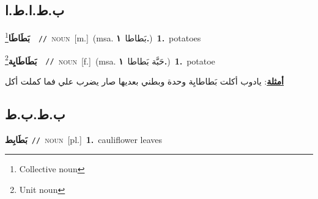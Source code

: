 \documentclass[10pt,a4paper,twoside]{article} %
\begin{document}
\begin{multicols}{2}
\vspace{-3mm}
\subsection*{\color{blue}\foreignlanguage{arabic}{ب.ط.ا.ط.ا}\color{blue}{ (ntws)}} 

{\setlength\topsep{0pt}\textbf{\foreignlanguage{arabic}{بَطَاطَا}}\footnote{Collective noun}\ \ {\color{gray}\texttt{//}\color{black}}\ \textsc{noun}\ [m.]\ \color{gray}(msa. \foreignlanguage{arabic}{بَطاطا}~\foreignlanguage{arabic}{\textbf{١.}})\color{black}\ \textbf{1.}~potatoes\ } \vspace{2mm}

{\setlength\topsep{0pt}\textbf{\foreignlanguage{arabic}{بَطَاطَايِة}}\footnote{Unit noun}\ \ {\color{gray}\texttt{//}\color{black}}\ \textsc{noun}\ [f.]\ \color{gray}(msa. \foreignlanguage{arabic}{حَبَّة بَطاطا}~\foreignlanguage{arabic}{\textbf{١.}})\color{black}\ \textbf{1.}~potatoe\  \begin{flushright}\color{gray}\foreignlanguage{arabic}{\textbf{\underline{\foreignlanguage{arabic}{أمثلة}}}: يادوب أكلت بَطاطايِة وحدة وبطني بعديها صار يضرب علي فما كملت أكل}\end{flushright}\color{black}} \vspace{2mm}

\vspace{-3mm}
\subsection*{\color{blue}\foreignlanguage{arabic}{ب.ط.ب.ط}\color{blue}{}} 

{\setlength\topsep{0pt}\textbf{\foreignlanguage{arabic}{بَطَابِط}}\ {\color{gray}\texttt{//}\color{black}}\ \textsc{noun}\ [pl.]\ \textbf{1.}~cauliflower leaves\ } \vspace{2mm}


\end{multicols}
\end{document}
